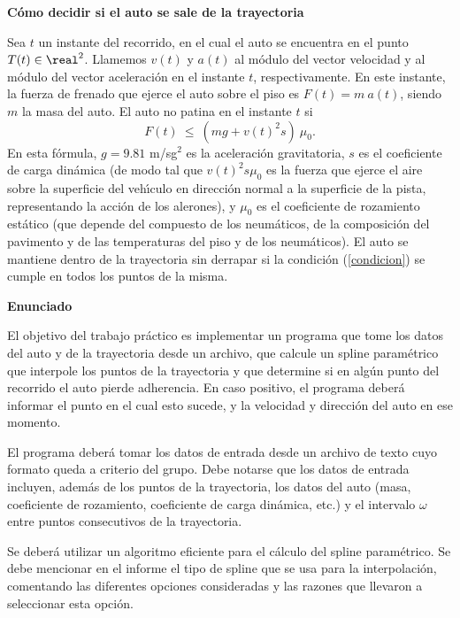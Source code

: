 \vfil \eject

\textbf{C\'omo decidir si el auto se sale de la trayectoria}

Sea $t$ un instante del recorrido, en el cual el auto se encuentra en el
punto $T(t)\in\real^2$. Llamemos $v(t)$ y $a(t)$ al m\'odulo del
vector velocidad y al m\'odulo del vector aceleraci\'on en el instante $t$,
respectivamente. En este instante, la fuerza de frenado que ejerce el auto
sobre el piso es $F(t) = m\: a(t)$, siendo $m$ la masa del auto. El auto
no patina en el instante $t$ si
\begin{equation}
F(t) \ \le\ (mg + v(t)^2s) \: \mu_0. \label{condicion}
\end{equation}
En esta f\'ormula, $g=9.81$ m/sg${}^2$ es la aceleraci\'on gravitatoria,
$s$ es el coeficiente de carga din\'amica (de modo tal que $v(t)^2 s\mu_0$ es
la fuerza que ejerce el aire sobre la superficie del veh\'\i culo en
direcci\'on normal a la superficie de la pista, representando la acci\'on
de los alerones), y $\mu_0$ es el coeficiente de rozamiento est\'atico
(que depende del compuesto de los neum\'aticos, de la composici\'on del
pavimento y de las temperaturas del piso y de los neum\'aticos). El auto
se mantiene dentro de la trayectoria sin derrapar si la condici\'on
(\ref{condicion}) se cumple en todos los puntos de la misma.

\textbf{Enunciado}

El objetivo del trabajo pr\'actico es implementar un programa que tome los
datos del auto y de la trayectoria desde un archivo, que calcule un
spline param\'etrico que interpole los puntos de la trayectoria y que
determine si en alg\'un punto del recorrido el auto pierde adherencia. En
caso positivo, el programa deber\'a informar el punto en el cual esto
sucede, y la velocidad y direcci\'on del auto en ese momento.

El programa deber\'a tomar los datos de entrada desde un archivo de texto
cuyo formato queda a criterio del grupo. Debe notarse que los datos de
entrada incluyen, adem\'as de los puntos de la trayectoria, los datos del
auto (masa, coeficiente de rozamiento, coeficiente de carga din\'amica, etc.)
y el intervalo $\omega$ entre puntos consecutivos de la trayectoria.

Se deber\'a utilizar un algoritmo eficiente para el c\'alculo del spline
param\'etrico. Se debe mencionar en el informe el tipo de spline que se usa
para la interpolaci\'on, comentando las diferentes opciones consideradas
y las razones que llevaron a seleccionar esta opci\'on.

